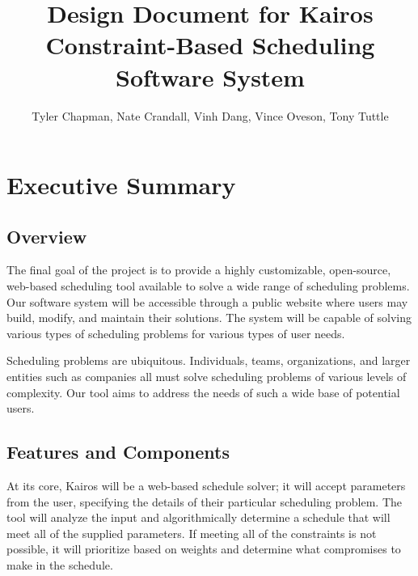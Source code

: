 \documentclass{extarticle}
\begin{document}
\begin{titlepage}
\title{Design Document for Kairos Constraint-Based Scheduling Software System}
\author{Tyler Chapman, Nate Crandall, Vinh Dang, Vince Oveson, Tony Tuttle}
\maketitle
\thispagestyle{empty}
\end{titlepage}

\tableofcontents
\listoffigures

\newpage

\section{Executive Summary} %

\subsection{Overview}
The final goal of the project is to provide a highly customizable, open-source, web-based scheduling tool available
to solve a wide range of scheduling problems.  Our software system will be accessible through a public
website where users may build, modify, and maintain their solutions.  The system will be capable of solving various
types of scheduling problems for various types of user needs.

Scheduling problems are ubiquitous.  Individuals, teams, organizations, and larger entities such as companies all
must solve scheduling problems of various levels of complexity.  Our tool aims to address the needs of such a wide
base of potential users.

\subsection{Features and Components}
At its core, Kairos will be a web-based schedule solver; it will accept parameters from the user, specifying the
details of their particular scheduling problem.  The tool will analyze the input and algorithmically determine a
schedule that will meet all of the supplied parameters.  If meeting all of the constraints is not possible, it will
prioritize based on weights and determine what compromises to make in the schedule.
\end{document}
